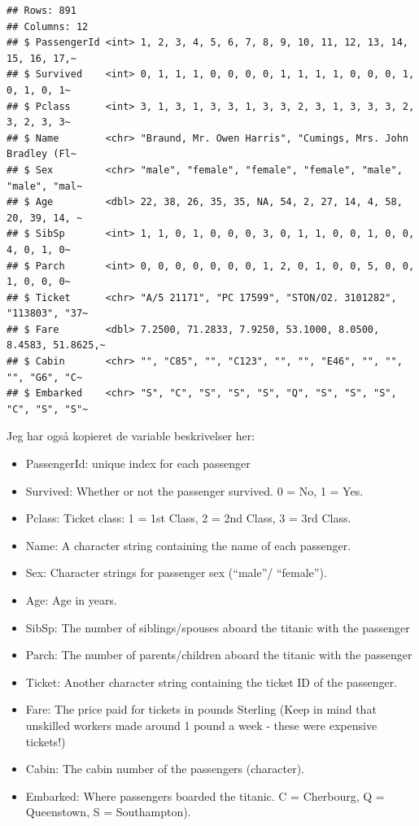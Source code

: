 \documentclass[
]{book}
\providecommand{\tightlist}{%
  \setlength{\itemsep}{0pt}\setlength{\parskip}{0pt}}
\begin{document}
\begin{verbatim}
## Rows: 891
## Columns: 12
## $ PassengerId <int> 1, 2, 3, 4, 5, 6, 7, 8, 9, 10, 11, 12, 13, 14, 15, 16, 17,~
## $ Survived    <int> 0, 1, 1, 1, 0, 0, 0, 0, 1, 1, 1, 1, 0, 0, 0, 1, 0, 1, 0, 1~
## $ Pclass      <int> 3, 1, 3, 1, 3, 3, 1, 3, 3, 2, 3, 1, 3, 3, 3, 2, 3, 2, 3, 3~
## $ Name        <chr> "Braund, Mr. Owen Harris", "Cumings, Mrs. John Bradley (Fl~
## $ Sex         <chr> "male", "female", "female", "female", "male", "male", "mal~
## $ Age         <dbl> 22, 38, 26, 35, 35, NA, 54, 2, 27, 14, 4, 58, 20, 39, 14, ~
## $ SibSp       <int> 1, 1, 0, 1, 0, 0, 0, 3, 0, 1, 1, 0, 0, 1, 0, 0, 4, 0, 1, 0~
## $ Parch       <int> 0, 0, 0, 0, 0, 0, 0, 1, 2, 0, 1, 0, 0, 5, 0, 0, 1, 0, 0, 0~
## $ Ticket      <chr> "A/5 21171", "PC 17599", "STON/O2. 3101282", "113803", "37~
## $ Fare        <dbl> 7.2500, 71.2833, 7.9250, 53.1000, 8.0500, 8.4583, 51.8625,~
## $ Cabin       <chr> "", "C85", "", "C123", "", "", "E46", "", "", "", "G6", "C~
## $ Embarked    <chr> "S", "C", "S", "S", "S", "Q", "S", "S", "S", "C", "S", "S"~
\end{verbatim}

Jeg har også kopieret de variable beskrivelser her:

\begin{itemize}
\tightlist
\item
  PassengerId: unique index for each passenger
\item
  Survived: Whether or not the passenger survived. 0 = No, 1 = Yes.
\item
  Pclass: Ticket class: 1 = 1st Class, 2 = 2nd Class, 3 = 3rd Class.
\item
  Name: A character string containing the name of each passenger.
\item
  Sex: Character strings for passenger sex (``male''/ ``female'').
\item
  Age: Age in years.
\item
  SibSp: The number of siblings/spouses aboard the titanic with the passenger
\item
  Parch: The number of parents/children aboard the titanic with the passenger
\item
  Ticket: Another character string containing the ticket ID of the passenger.
\item
  Fare: The price paid for tickets in pounds Sterling (Keep in mind that unskilled workers made around 1 pound a week - these were expensive tickets!)
\item
  Cabin: The cabin number of the passengers (character).
\item
  Embarked: Where passengers boarded the titanic. C = Cherbourg, Q = Queenstown, S = Southampton).
\end{itemize}
\end{document}
